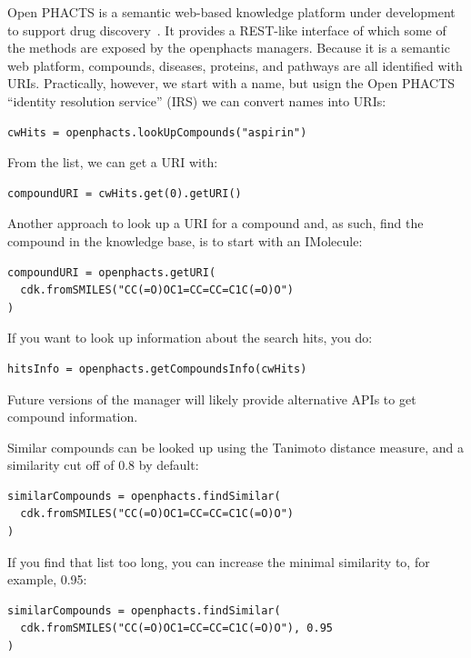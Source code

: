 \documentclass[a5paper, 10pt]{memoir}
\begin{document}
\begin{refsection}
Open PHACTS is a semantic web-based knowledge platform under
development to support drug discovery~\cite{Williams2012}. It provides a
REST-like interface of which some of the methods are exposed by the openphacts
managers. Because it is a semantic web platform, compounds, diseases, proteins,
and pathways are all identified with URIs. Practically, however, we start with
a name, but usign the Open PHACTS ``identity resolution service'' (IRS) we can
convert names into URIs:

\begin{Verbatim}
cwHits = openphacts.lookUpCompounds("aspirin")
\end{Verbatim}
From the list, we can get a URI with:

\begin{Verbatim}
compoundURI = cwHits.get(0).getURI()
\end{Verbatim}
Another approach to look up a URI for a compound and, as such, find the
compound in the knowledge base, is to start with an IMolecule:

\begin{Verbatim}
compoundURI = openphacts.getURI(
  cdk.fromSMILES("CC(=O)OC1=CC=CC=C1C(=O)O")
)
\end{Verbatim}
If you want to look up information about the search hits, you do:

\begin{Verbatim}
hitsInfo = openphacts.getCompoundsInfo(cwHits)
\end{Verbatim}
Future versions of the manager will likely provide alternative APIs to get
compound information.

Similar compounds can be looked up using the Tanimoto distance measure, and a
similarity cut off of 0.8 by default:

\begin{Verbatim}
similarCompounds = openphacts.findSimilar(
  cdk.fromSMILES("CC(=O)OC1=CC=CC=C1C(=O)O")
)
\end{Verbatim}
If you find that list too long, you can increase the minimal similarity to, for
example, 0.95:

\begin{Verbatim}
similarCompounds = openphacts.findSimilar(
  cdk.fromSMILES("CC(=O)OC1=CC=CC=C1C(=O)O"), 0.95
)
\end{Verbatim}


\printbibliography[heading=subbibliography]
\end{refsection}


\cleardoublepage
\printindex
\end{document}
